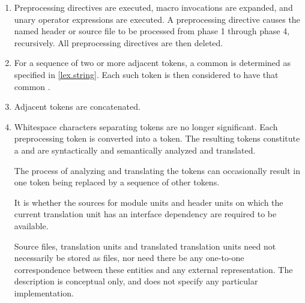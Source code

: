\begin{enumerate}
\item Preprocessing directives are executed, macro invocations are
expanded, and  unary operator expressions are executed.
A  preprocessing directive causes the named header or
source file to be processed from phase 1 through phase 4, recursively.
All preprocessing directives are then deleted.

\item
For a sequence of two or more adjacent  tokens,
a common  is determined
as specified in \ref{lex.string}.
Each such  token is then considered to have
that common .

\item
Adjacent  tokens are concatenated.

\item Whitespace characters separating tokens are no longer
significant. Each preprocessing token is converted into a
token. The resulting tokens
constitute a  and
are syntactically and
semantically analyzed and translated.
\begin{note}
The process of analyzing and translating the tokens can occasionally
result in one token being replaced by a sequence of other
tokens.
\end{note}
It is
whether the sources for
module units and header units
on which the current translation unit has an interface
dependency
are required to be available.
\begin{note}
Source files, translation
units and translated translation units need not necessarily be stored as
files, nor need there be any one-to-one correspondence between these
entities and any external representation. The description is conceptual
only, and does not specify any particular implementation.
\end{note}


\end{enumerate}
